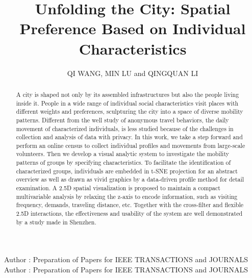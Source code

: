 \documentclass{ieeeaccess}
\begin{document}

\title{Unfolding the City: Spatial Preference Based on Individual Characteristics}


\author{\uppercase{Qi wang}, \uppercase{min lu} and \uppercase{Qingquan Li}}
\address[1]{State Key Laboratory of Information Engineering in Surveying, Mapping and Remote Sensing, Wuhan University, Wuhan 430072, China}
\address[2]{Shenzhen Key Laboratory of Spatial Smart Sensing and Services, Shenzhen University, Shenzhen 518060, China}
\address[3]{School of Architecture and Urban Planning, ShenZhen University, Shenzhen 518060, China}



\markboth
{Author \headeretal: Preparation of Papers for IEEE TRANSACTIONS and JOURNALS}
{Author \headeretal: Preparation of Papers for IEEE TRANSACTIONS and JOURNALS}


\begin{abstract}
A city is shaped not only by its assembled infrastructures but also the people living inside it. People in a wide range of individual social characteristics visit places with different weights and preferences, sculpturing the city into a space of diverse mobility patterns. Different from the well study of anonymous travel behaviors, the daily movement of characterized individuals, is less studied because of the challenges in collection and analysis of data with privacy. In this work, we take a step forward and perform an online census to collect individual profiles and movements from large-scale volunteers. Then we develop a visual analytic system to investigate the mobility patterns of groups by specifying characteristics. To facilitate the identification of characterized groups, individuals are embedded in t-SNE projection for an abstract overview as well as drawn as vivid graphics by a data-driven profile method for detail examination. A 2.5D spatial visualization is proposed to maintain a compact multivariable analysis by relaxing the z-axis to encode information, such as visiting frequency, demands, traveling distance, etc. Together with the cross-filter and flexible 2.5D interactions, the effectiveness and usability of the system are well demonstrated by a study made in Shenzhen.\end{abstract}
\end{document}
